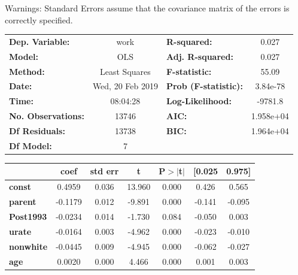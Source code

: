 \documentclass{article}
\begin{document}
\begin{enumerate}[label=\alph*]
Warnings: \newline
 [1] Standard Errors assume that the covariance matrix of the errors is correctly specified.

\begin{center}
\begin{tabular}{lclc}
\toprule
\textbf{Dep. Variable:}    &       work       & \textbf{  R-squared:         } &     0.027   \\
\textbf{Model:}            &       OLS        & \textbf{  Adj. R-squared:    } &     0.027   \\
\textbf{Method:}           &  Least Squares   & \textbf{  F-statistic:       } &     55.09   \\
\textbf{Date:}             & Wed, 20 Feb 2019 & \textbf{  Prob (F-statistic):} &  3.84e-78   \\
\textbf{Time:}             &     08:04:28     & \textbf{  Log-Likelihood:    } &   -9781.8   \\
\textbf{No. Observations:} &       13746      & \textbf{  AIC:               } & 1.958e+04   \\
\textbf{Df Residuals:}     &       13738      & \textbf{  BIC:               } & 1.964e+04   \\
\textbf{Df Model:}         &           7      & \textbf{                     } &             \\
\bottomrule
\end{tabular}
\begin{tabular}{lcccccc}
                  & \textbf{coef} & \textbf{std err} & \textbf{t} & \textbf{P$>$$|$t$|$} & \textbf{[0.025} & \textbf{0.975]}  \\
\midrule
\textbf{const}    &       0.4959  &        0.036     &    13.960  &         0.000        &        0.426    &        0.565     \\
\textbf{parent}   &      -0.1179  &        0.012     &    -9.891  &         0.000        &       -0.141    &       -0.095     \\
\textbf{Post1993} &      -0.0234  &        0.014     &    -1.730  &         0.084        &       -0.050    &        0.003     \\
\textbf{urate}    &      -0.0164  &        0.003     &    -4.962  &         0.000        &       -0.023    &       -0.010     \\
\textbf{nonwhite} &      -0.0445  &        0.009     &    -4.945  &         0.000        &       -0.062    &       -0.027     \\
\textbf{age}      &       0.0020  &        0.000     &     4.466  &         0.000        &        0.001    &        0.003     \\

\end{tabular}
\end{center}
\end{enumerate}
\end{document}
